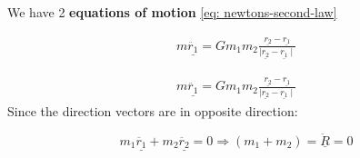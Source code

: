 We have 2 {\bf equations of motion} \eqref{eq: newtons-second-law}

\begin{align*}
	m\underline{\ddot{r_{1}}} = Gm_{1}m_{2}\frac{ \underline{r_{2}} - \underline{r_{1}}}{ \mid \underline{r_{2}} - \underline{r_{1}} \mid} \label{eq:
		two-body-grav-1} \tag{G1}
\end{align*}

\begin{align*}
	m\underline{\ddot{r_{1}}} = Gm_{1}m_{2}\frac{ \underline{r_{2}} - \underline{r_{1}}}{ \mid \underline{r_{2}} - \underline{r_{1}} \mid} \label{eq:
		two-body-grav-2} \tag{G2}
\end{align*}
Since the direction vectors are in opposite direction:

$$m_{1}\underline{\ddot{r_{1}}} + m_{2} \underline{\ddot{r_{2}}} = 0 \Rightarrow (m_{1} + m_{2}) = \underline{\ddot{R}} = 0$$


